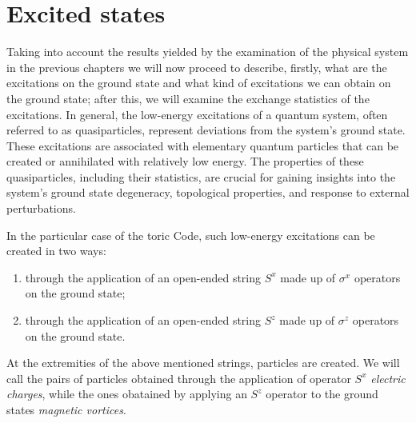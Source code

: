 \documentclass{Configuration_Files/PoliMi3i_thesis}
\begin{document}





















\newpage
\section{Excited states}
\label{sec:ES}


Taking into account the results yielded by the examination of the physical system in the previous chapters we will now proceed to describe, firstly, what are the excitations on the ground state and what kind of excitations we can obtain on the ground state; after this, we will examine the exchange statistics of the excitations.\newline
In general, the low-energy excitations of a quantum system, often referred to as quasiparticles, represent deviations from the system's ground state. These excitations are associated with elementary quantum particles that can be created or annihilated with relatively low energy. The properties of these quasiparticles, including their statistics, are crucial for gaining insights into the system's ground state degeneracy, topological properties, and response to external perturbations. \newline

In the particular case of the toric Code, such low-energy excitations can be created in two ways: 

\begin{enumerate}
	\item through the application of an open-ended string $S^x$ made up of $\sigma^x$ operators on the ground state;
	
	\item through the application of an open-ended string $S^z$ made up of $\sigma^z$ operators on the ground state.
\end{enumerate}

At the extremities of the above mentioned strings, particles are created. We will call the pairs of particles obtained through the application of operator $S^x$ \textit{electric charges}, while the ones obatained by applying an $S^z$ operator to the ground states \textit{magnetic vortices}.\newline
\end{document}
